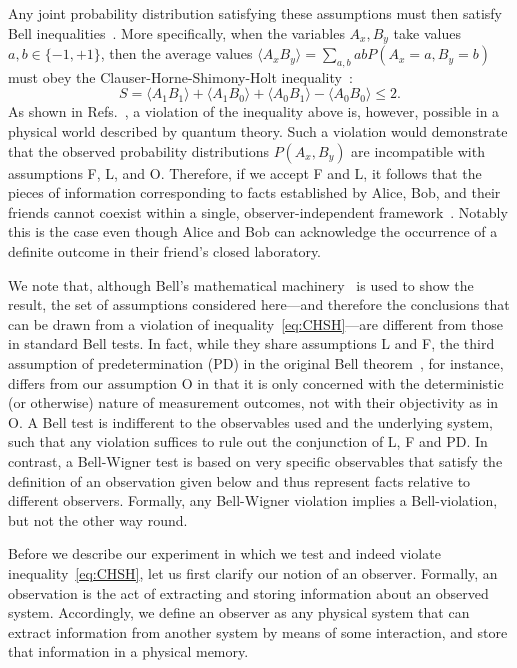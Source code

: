 \documentclass[aps,floatfix,superscriptaddress,twocolumn,tightenlines,amsmath,amssymb,nofootinbib,10pt]{revtex4-1}
\begin{document}
Any joint probability distribution satisfying these assumptions must then satisfy Bell inequalities~\cite{Fine1982}. More specifically, when the variables $A_x, B_y$ take values $a,b\in\{-1,+1\}$, then the average values $\langle A_xB_y \rangle = \sum_{a,b}a b P(A_x = a,B_y=b)$ must obey the Clauser-Horne-Shimony-Holt inequality~\cite{CHSH1969}:
\begin{equation}
 S  = \langle A_1B_1 \rangle + \langle A_1B_0 \rangle + \langle A_0B_1 \rangle - \langle A_0B_0 \rangle \leq 2 .
\label{eq:CHSH} 
\end{equation}
As shown in Refs.~\cite{Brukner2015MeasurementProblem,Brukner2018}, a violation of the inequality above is, however, possible in a physical world described by quantum theory. Such a violation would demonstrate that the observed probability distributions $P(A_x,B_y)$ are incompatible with assumptions F, L, and O. Therefore, if we accept F and L, it follows that the pieces of information corresponding to facts established by Alice, Bob, and their friends cannot coexist within a single, observer-independent framework~\cite{Brukner2015MeasurementProblem,Brukner2018}. Notably this is the case even though Alice and Bob can acknowledge the occurrence of a definite outcome in their friend's closed laboratory.

We note that, although Bell's mathematical machinery~\cite{bell_aspect_2004} is used to show the result, the set of assumptions considered here---and therefore the conclusions that can be drawn from a violation of inequality~\eqref{eq:CHSH}---are different from those in standard Bell tests. In fact, while they share assumptions L and F, the third assumption of predetermination (PD) in the original Bell theorem~\cite{Bell1964}, for instance, differs from our assumption O in that it is only concerned with the deterministic (or otherwise) nature of measurement outcomes, not with their objectivity as in O. A Bell test is indifferent to the observables used and the underlying system, such that any violation suffices to rule out the conjunction of L, F and PD. In contrast, a Bell-Wigner test is based on very specific observables that satisfy the definition of an observation given below and thus represent facts relative to different observers. Formally, any Bell-Wigner violation implies a Bell-violation, but not the other way round.

Before we describe our experiment in which we test and indeed violate inequality~\eqref{eq:CHSH}, let us first clarify our notion of an observer. Formally, an observation is the act of extracting and storing information about an observed system. Accordingly, we define an observer as any physical system that can extract information from another system by means of some interaction, and store that information in a physical memory.
\end{document}
